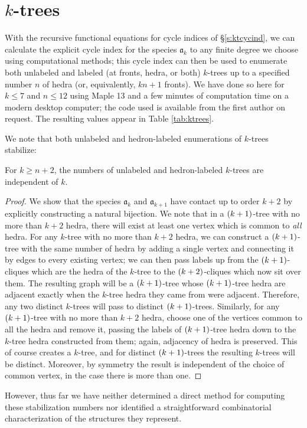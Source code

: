 \documentclass[sectionflow,singlespace,twoside,boldmathhdr,draft]{brandiss} %
\numberwithin{section}{chapter}
\numberwithin{figure}{chapter}
\begin{document}
\section{$k$-trees}\label{s:ktenum}
With the recursive functional equations for cycle indices of \S \ref{s:ktcycind}, we can calculate the explicit cycle index for the species $\mathfrak{a}_{k}$ to any finite degree we choose using computational methods; this cycle index can then be used to enumerate both unlabeled and labeled (at fronts, hedra, or both) $k$-trees up to a specified number $n$ of hedra (or, equivalently, $kn + 1$ fronts).
We have done so here for $k \leq 7$ and $n \leq 12$ using Maple 13 and a few minutes of computation time on a modern desktop computer; the code used is available from the first author on request.
The resulting values appear in Table \ref{tab:ktrees}.

We note that both unlabeled and hedron-labeled enumerations of $k$-trees stabilize:
\begin{theorem}
  \label{thm:ktreestab}
  For $k \geq n + 2$, the numbers of unlabeled and hedron-labeled $k$-trees are independent of $k$.
\end{theorem}
\begin{proof}
  We show that the species $\mathfrak{a}_{k}$ and $\mathfrak{a}_{k+1}$ have contact up to order $k+2$ by explicitly constructing a natural bijection.
  We note that in a $\left( {k+1} \right)$-tree with no more than $k+2$ hedra, there will exist at least one vertex which is common to \emph{all} hedra.
  For any $k$-tree with no more than $k+2$ hedra, we can construct a $\left( {k+1} \right)$-tree with the same number of hedra by adding a single vertex and connecting it by edges to every existing vertex; we can then pass labels up from the $\left( {k+1} \right)$-cliques which are the hedra of the $k$-tree to the $\left( {k+2} \right)$-cliques which now sit over them.
  The resulting graph will be a $\left( {k+1} \right)$-tree whose $\left( {k+1} \right)$-tree hedra are adjacent exactly when the $k$-tree hedra they came from were adjacent.
  Therefore, any two distinct $k$-trees will pass to distinct $\left( {k+1} \right)$-trees.
  Similarly, for any $\left( {k+1} \right)$-tree with no more than $k+2$ hedra, choose one of the vertices common to all the hedra and remove it, passing the labels of $\left( {k+1} \right)$-tree hedra down to the $k$-tree hedra constructed from them; again, adjacency of hedra is preserved.
  This of course creates a $k$-tree, and for distinct $\left( {k+1} \right)$-trees the resulting $k$-trees will be distinct.
  Moreover, by symmetry the result is independent of the choice of common vertex, in the case there is more than one.
\end{proof}
However, thus far we have neither determined a direct method for computing these stabilization numbers nor identified a straightforward combinatorial characterization of the structures they represent.
\end{document}
